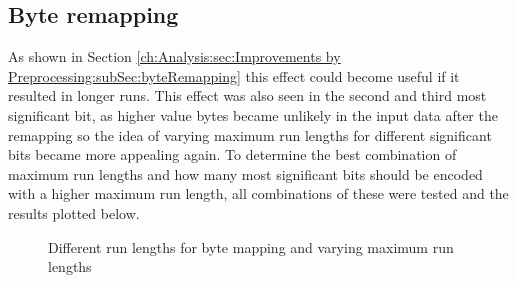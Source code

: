 \subsection{Byte remapping}
\par{
As shown in Section \ref{ch:Analysis:sec:Improvements by Preprocessing:subSec:byteRemapping} this effect could become useful if it resulted in longer runs. This effect was also seen in the second and third most significant bit, as higher value bytes became unlikely in the input data after the remapping so the idea of varying maximum run lengths for different significant bits became more appealing again. To determine the best combination of maximum run lengths and how many most significant bits should be encoded with a higher maximum run length, all combinations of these were tested and the results plotted below.
}
\begin{figure}[H]
\caption{Different run lengths for byte mapping and varying maximum run lengths}
\label{fig:2:different run lengths for byte mapping and varying maximum run lengths}
\end{figure}

